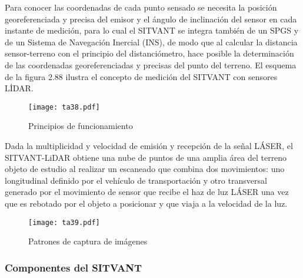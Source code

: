 Para conocer las coordenadas de cada punto sensado se necesita la posición georeferenciada y precisa del emisor y el ángulo de inclinación del sensor en cada instante de medición, para lo cual el SITVANT se integra también de un SPGS y de un Sistema de Navegación Inercial (INS), de modo que al calcular la distancia sensor-terreno con el principio del distanciómetro, hace posible la determinación de las coordenadas georeferenciadas y precisas del punto del terreno. El esquema de la figura 2.88 ilustra el concepto de medición del SITVANT con sensores LİDAR.
\begin{figure}[h!]
\centering
  \texttt{[image: ta38.pdf]}
  \caption{Principios de funcionamiento}
  \label{ta38}
\end{figure}
Dada la multiplicidad y velocidad de emisión y recepción de la señal LÁSER, el SITVANT-LiDAR obtiene una nube de puntos de una amplia área del terreno objeto de estudio al realizar un escaneado que combina dos movimientos: uno longitudinal definido por el vehículo de transportación y otro transversal generado por el movimiento de sensor que recibe el haz de luz LÁSER una vez que es rebotado por el objeto a posicionar y que viaja a la velocidad de la luz.
\begin{figure}[h!]
    \centering
      \texttt{[image: ta39.pdf]}
      \caption{Patrones de captura de imágenes}
      \label{ta39}
    \end{figure}

\subsubsection{Componentes del SITVANT}

